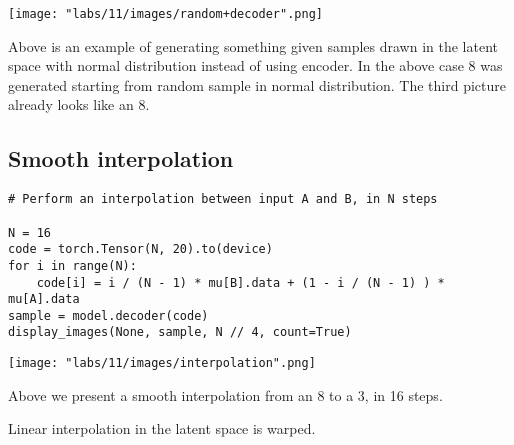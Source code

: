 \texttt{[image: "labs/11/images/random+decoder".png]}


Above is an example of generating something given samples drawn in the latent space with normal distribution instead of using encoder. In the above case 8 was generated starting from random sample in normal distribution. The third picture already looks like an 8.

\subsection{Smooth interpolation} 
\begin{verbatim}
# Perform an interpolation between input A and B, in N steps

N = 16
code = torch.Tensor(N, 20).to(device)
for i in range(N):
    code[i] = i / (N - 1) * mu[B].data + (1 - i / (N - 1) ) * mu[A].data
sample = model.decoder(code)
display_images(None, sample, N // 4, count=True)
\end{verbatim}

\texttt{[image: "labs/11/images/interpolation".png]}

Above we present a smooth interpolation from an 8 to a 3, in 16 steps.

Linear interpolation in the latent space is warped. 